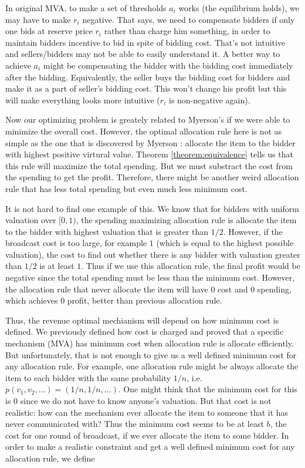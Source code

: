 \begin{proposition}
In original MVA, to make a set of thresholds $a_i$ works (the
equilibrium holds), we may have to make $r_i$ negative. That says, we need to
compensate bidders if only one bids at reserve price $r_i$ rather than charge
him something, in order to maintain bidders incentive to bid in spite of
bidding cost. That's not intuitive and sellers/bidders may
not be able to easily understand it. A better way to achieve $a_i$ might be
compensating the bidder with the bidding cost immediately after the bidding.
Equivalently, the seller buys the bidding cost for bidders and make it as a
part of seller's bidding cost. This won't change his profit but this will make
everything looks more intuitive ($r_i$ is non-negative again).
\end{proposition}

Now our optimizing problem is greately related to Myerson's if we were able to
minimize the overall cost. However, the optimal allocation rule here is not as
simple as the one that is discovered by Myerson \cite{Myerson:1981}: allocate
the item to the bidder with highest positive virtural value.  Theorem
\ref{theorem:equivalence} tells us that this rule will maximize the total
spending.  But we must substract the cost from the spending to get the profit.
Therefore, there might be another weird allocation rule that has less total
spending but even much less minimum cost.

It is not hard to find one example of this. We know that for bidders
with uniform valuation over $[0, 1)$, the spending maximizing allocation rule
is allocate the item to the bidder with highest valuation that is greater than $1/2$.
However, if the broadcast cost is too large, for example $1$ (which is equal to the
highest possible valuation), the cost to find out whether there is any bidder with valuation
greater than $1/2$ is at least $1$. Thus if we use this allocation rule, the
final profit would be negative since the total spending must be less than the
minimum cost. However, the allocation rule that never allocate the item will have
$0$ cost and $0$ spending, which achieves $0$ profit, better than previous allocation
rule.

Thus, the revenue optimal mechianism will depend on how minimum cost is defined. 
We previously defined how cost is charged and proved that a specific mechanism (MVA)
has minimum cost when allocation rule is allocate efficiently. But unfortunately,
that is not enough to give us a well defined minimum cost for any allocation rule.
For example, one allocation rule might be always allocate the item to each bidder
with the same probability $1/n$, i.e. $p(v_1, v_2, \ldots) = (1/n, 1/n, \ldots)$.
One might think that the minimum cost for this is $0$ since we do not have to know
anyone's valuation. But that cost is not realistic: how can the mechanism ever allocate the
item to someone that it has never communicated with? Thus the minimum cost seems
to be at least $b$, the cost for one round of broadcast, if we ever allocate the item
to some bidder. In order to make a realistic constraint and get a well defined minimum
cost for any allocation rule, we define

